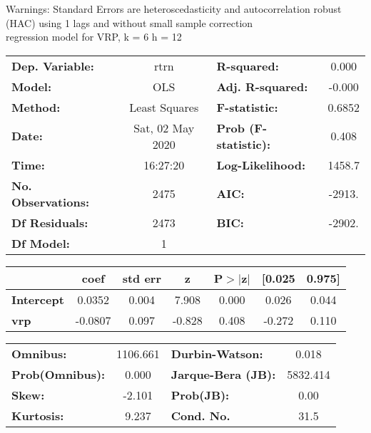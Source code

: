 Warnings: \newline
 [1] Standard Errors are heteroscedasticity and autocorrelation robust (HAC) using 1 lags and without small sample correction\\ 

regression model for VRP, k = 6 h = 12\begin{center}
\begin{tabular}{lclc}
\toprule
\textbf{Dep. Variable:}    &       rtrn       & \textbf{  R-squared:         } &     0.000   \\
\textbf{Model:}            &       OLS        & \textbf{  Adj. R-squared:    } &    -0.000   \\
\textbf{Method:}           &  Least Squares   & \textbf{  F-statistic:       } &    0.6852   \\
\textbf{Date:}             & Sat, 02 May 2020 & \textbf{  Prob (F-statistic):} &    0.408    \\
\textbf{Time:}             &     16:27:20     & \textbf{  Log-Likelihood:    } &    1458.7   \\
\textbf{No. Observations:} &        2475      & \textbf{  AIC:               } &    -2913.   \\
\textbf{Df Residuals:}     &        2473      & \textbf{  BIC:               } &    -2902.   \\
\textbf{Df Model:}         &           1      & \textbf{                     } &             \\
\bottomrule
\end{tabular}
\begin{tabular}{lcccccc}
                   & \textbf{coef} & \textbf{std err} & \textbf{z} & \textbf{P$> |$z$|$} & \textbf{[0.025} & \textbf{0.975]}  \\
\midrule
\textbf{Intercept} &       0.0352  &        0.004     &     7.908  &         0.000        &        0.026    &        0.044     \\
\textbf{vrp}       &      -0.0807  &        0.097     &    -0.828  &         0.408        &       -0.272    &        0.110     \\
\bottomrule
\end{tabular}
\begin{tabular}{lclc}
\textbf{Omnibus:}       & 1106.661 & \textbf{  Durbin-Watson:     } &    0.018  \\
\textbf{Prob(Omnibus):} &   0.000  & \textbf{  Jarque-Bera (JB):  } & 5832.414  \\
\textbf{Skew:}          &  -2.101  & \textbf{  Prob(JB):          } &     0.00  \\
\textbf{Kurtosis:}      &   9.237  & \textbf{  Cond. No.          } &     31.5  \\
\bottomrule
\end{tabular}
\end{center}

